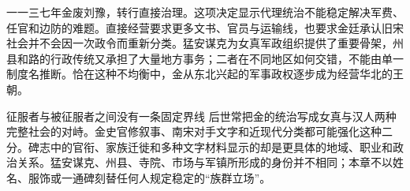 一一三七年金废刘豫，转行直接治理。这项决定显示代理统治不能稳定解决军费、任官和边防的难题。直接经营要求更多文书、官员与运输线，也要求金廷承认旧宋社会并不会因一次政令而重新分类。猛安谋克为女真军政组织提供了重要骨架，州县和路的行政传统又承担了大量地方事务；二者在不同地区如何交错，不能由单一制度名推断。恰在这种不均衡中，金从东北兴起的军事政权逐步成为经营华北的王朝。

\begin{debate}{征服者与被征服者之间没有一条固定界线}
后世常把金的统治写成女真与汉人两种完整社会的对峙。金史官修叙事、南宋对手文字和近现代分类都可能强化这种二分。碑志中的官衔、家族迁徙和多种文字材料显示的却是更具体的地域、职业和政治关系。猛安谋克、州县、寺院、市场与军镇所形成的身份并不相同；本章不以姓名、服饰或一通碑刻替任何人规定稳定的“族群立场”。
\end{debate}
